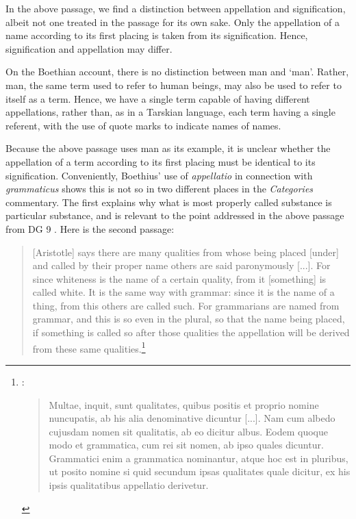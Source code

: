 \documentclass[]{article}
\begin{document}
In the above passage, we find a distinction between appellation and signification, albeit not one treated in the passage for its own sake. Only the appellation of a name according to its first placing is taken from its signification. Hence, signification and appellation may differ. 

On the Boethian account, there is no distinction between man and `man'. Rather, man, the same term used to refer to human beings, may also be used to refer to itself as a term. Hence, we have a single term capable of having different appellations, rather than, as in a Tarskian language, each term having a single referent, with the use of quote marks to indicate names of names.

Because the above passage uses man as its example, it is unclear whether the appellation of a term according to its first placing must be identical to its signification. Conveniently, Boethius' use of \textit{appellatio} in connection with \textit{grammaticus} shows this is not so in two different places in the \textit{Categories} commentary. The first explains why what is most properly called substance is particular substance, and is relevant to the point addressed in the above passage from DG 9 \cite[BC182CD]{BC}. Here is the second passage:

\begin{quote}
[Aristotle] says there are many qualities from whose being placed [under] and called by their proper name others are said paronymously [...]. For since whiteness is the name of a certain quality, from it [something] is called white. It is the same way with grammar: since it is the name of a thing, from this others are called such. For grammarians are named from grammar, and this is so even in the plural, so that the name being placed, if something is called so after those qualities the appellation will be derived from these same qualities.\footnote{\cite[BC 253A]{BC}:
\begin{quote}
Multae, inquit, sunt qualitates, quibus positis et proprio nomine nuncupatis, ab his alia denominative dicuntur [...]. Nam cum albedo cujusdam nomen sit qualitatis, ab eo dicitur albus. Eodem quoque modo et grammatica, cum rei sit nomen, ab ipso quales dicuntur. Grammatici enim a grammatica nominantur, atque hoc est in pluribus, ut posito nomine si quid secundum ipsas qualitates quale dicitur, ex his ipsis qualitatibus appellatio derivetur.
\end{quote}}
\end{quote}
\end{document}
